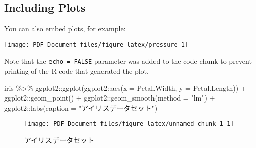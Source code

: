 \documentclass[
  12pt,
  xelatex,ja=standard]{bxjsarticle}
\newenvironment{Shaded}{\begin{snugshade}}{\end{snugshade}}
\newcommand{\AttributeTok}[1]{\textcolor[rgb]{0.77,0.63,0.00}{#1}}
\newcommand{\FunctionTok}[1]{\textcolor[rgb]{0.00,0.00,0.00}{#1}}
\newcommand{\NormalTok}[1]{#1}
\newcommand{\SpecialCharTok}[1]{\textcolor[rgb]{0.00,0.00,0.00}{#1}}
\newcommand{\StringTok}[1]{\textcolor[rgb]{0.31,0.60,0.02}{#1}}
\begin{document}
\newpage

\hypertarget{including-plots}{%
\subsection{Including Plots}\label{including-plots}}

You can also embed plots, for example:

\begin{center}\texttt{[image: PDF\_Document\_files/figure-latex/pressure-1]} \end{center}

Note that the \texttt{echo\ =\ FALSE} parameter was added to the code
chunk to prevent printing of the R code that generated the plot.

\begin{Shaded}
\begin{Highlighting}[numbers=left,,]
\NormalTok{iris }\SpecialCharTok{\%\textgreater{}\%} 
\NormalTok{  ggplot2}\SpecialCharTok{::}\FunctionTok{ggplot}\NormalTok{(ggplot2}\SpecialCharTok{::}\FunctionTok{aes}\NormalTok{(}\AttributeTok{x =}\NormalTok{ Petal.Width, }\AttributeTok{y =}\NormalTok{ Petal.Length)) }\SpecialCharTok{+} 
\NormalTok{    ggplot2}\SpecialCharTok{::}\FunctionTok{geom\_point}\NormalTok{() }\SpecialCharTok{+} 
\NormalTok{    ggplot2}\SpecialCharTok{::}\FunctionTok{geom\_smooth}\NormalTok{(}\AttributeTok{method =} \StringTok{"lm"}\NormalTok{) }\SpecialCharTok{+}
\NormalTok{    ggplot2}\SpecialCharTok{::}\FunctionTok{labs}\NormalTok{(}\AttributeTok{caption =} \StringTok{"アイリスデータセット"}\NormalTok{)}
\end{Highlighting}
\end{Shaded}

\begin{figure}

{\centering \texttt{[image: PDF\_Document\_files/figure-latex/unnamed-chunk-1-1]} 

}

\caption{アイリスデータセット}\label{fig:unnamed-chunk-1}
\end{figure}
\end{document}
